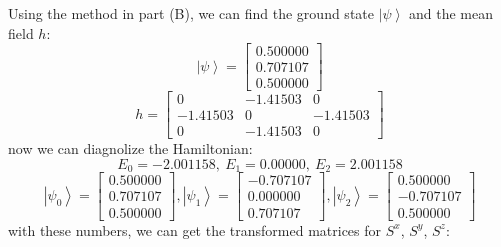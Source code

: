 \documentclass[letter]{article}
\begin{document}
Using the method in part (B), we can find the ground state $\left|\psi\right>$ and the mean field $h$:
$$
\left|\psi\right>=\begin{bmatrix}
    0.500000 \\
0.707107 \\
0.500000
    \end{bmatrix}
$$
$$
h=\begin{bmatrix}
    0 & -1.41503 & 0 \\
    -1.41503 &  0 & -1.41503 \\
    0 &  -1.41503 & 0
    \end{bmatrix}
$$
now we can diagnolize the Hamiltonian:
$$E_{0}=-2.001158,\ E_{1}=0.00000,\ E_{2}=2.001158
$$
$$\left|\psi_0\right>=\begin{bmatrix}
    0.500000 \\
0.707107 \\
0.500000
    \end{bmatrix},\left|\psi_1\right>=\begin{bmatrix}
       -0.707107 \\
    0.000000 \\
    0.707107
        \end{bmatrix},\left|\psi_2\right>=\begin{bmatrix}
            0.500000 \\
        -0.707107 \\
        0.500000
            \end{bmatrix}
$$
with these numbers, we can get the transformed matrices for $S^x$, $S^y$, $S^z$:
\end{document}

